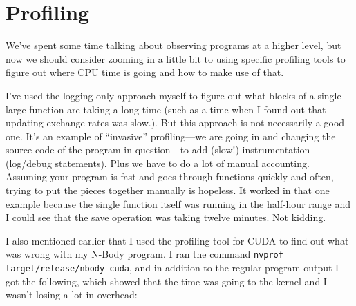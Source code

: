 




\section*{Profiling}
We've spent some time talking about observing programs at a higher level, but now we should consider zooming in a little bit to using specific profiling tools to figure out where CPU time is going and how to make use of that.

I've used the logging-only approach myself to figure out what blocks of a single large function are taking a long time (such as a time when I found out that updating exchange rates was slow.). But this approach is not necessarily a good one.  It's an example of ``invasive'' profiling---we are going in and changing the source code of the program in question---to add (slow!) instrumentation (log/debug statements). Plus we have to do a lot of manual accounting. Assuming your program is fast and goes through functions quickly and often, trying to put the pieces together manually is hopeless. It worked in that one example because the single function itself was running in the half-hour range and I could see that the save operation was taking twelve minutes. Not kidding.

I also mentioned earlier that I used the profiling tool for CUDA to find out what was wrong with my N-Body program. I ran the command \texttt{nvprof target/release/nbody-cuda}, and in addition to the regular program output I got the following, which showed that the time was going to the kernel and I wasn't losing a lot in overhead:

